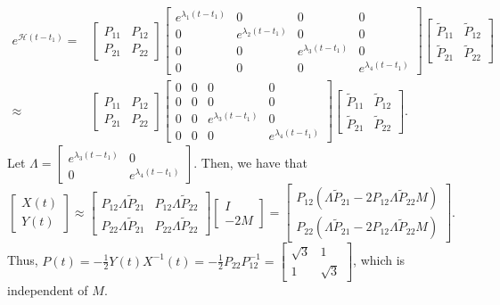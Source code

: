 \documentclass[11pt]{report}
\begin{document}
\begin{align*}
e^{\mathcal{H}(t-t_1)} = & \begin{bmatrix}P_{11} & P_{12}\\P_{21} & P_{22}\end{bmatrix} \begin{bmatrix}e^{\lambda_1(t-t_1)} & 0 & 0 & 0\\ 0 & e^{\lambda_2(t-t_1)} & 0 & 0\\ 0 & 0 & e^{\lambda_3(t-t_1)} & 0\\0 & 0 & 0 & e^{\lambda_4(t-t_1)}\end{bmatrix} \begin{bmatrix}\tilde{P}_{11} & \tilde{P}_{12}\\\tilde{P}_{21} & \tilde{P}_{22}\end{bmatrix}\\ \approx & \begin{bmatrix}P_{11} & P_{12}\\P_{21} & P_{22}\end{bmatrix} \begin{bmatrix}0 & 0 & 0 & 0\\ 0 & 0 & 0 & 0\\ 0 & 0 & e^{\lambda_3(t-t_1)} & 0\\0 & 0 & 0 & e^{\lambda_4(t-t_1)}\end{bmatrix} \begin{bmatrix}\tilde{P}_{11} & \tilde{P}_{12}\\\tilde{P}_{21} & \tilde{P}_{22}\end{bmatrix}.
\end{align*}
Let $\Lambda = \begin{bmatrix}e^{\lambda_3(t-t_1)} & 0\\0 & e^{\lambda_4(t-t_1)}\end{bmatrix}$. Then, we have that
\[
\begin{bmatrix}X(t)\\Y(t)\end{bmatrix} \approx \begin{bmatrix}P_{12}\Lambda\tilde{P}_{21} & P_{12}\Lambda\tilde{P}_{22}\\P_{22}\Lambda\tilde{P}_{21} & P_{22}\Lambda\tilde{P}_{22}\end{bmatrix} \begin{bmatrix}I\\-2M\end{bmatrix} = \begin{bmatrix}P_{12}(\Lambda\tilde{P}_{21}-2P_{12}\Lambda\tilde{P}_{22}M)\\P_{22}(\Lambda\tilde{P}_{21}-2P_{12}\Lambda\tilde{P}_{22}M)\end{bmatrix}.
\]
Thus, $P(t) = -\frac{1}{2}Y(t)X^{-1}(t) = -\frac{1}{2}P_{22}P_{12}^{-1} = \begin{bmatrix}\sqrt{3} & 1\\ 1 & \sqrt{3}\end{bmatrix}$, which is independent of $M$.
\end{document}

